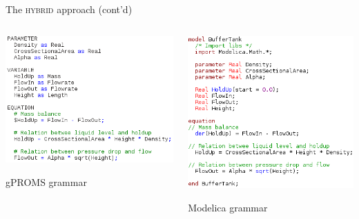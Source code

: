 \documentclass[compress,newPxFont,sthlmFooter]{beamer}
\begin{document}
\begin{frame}[plain]{The \textsc{hybrid} approach (cont'd)}
    \begin{columns}[b]
      \begin{column}{0.5\paperwidth}
        \begin{center}
           \includegraphics[align=c, width=0.35\paperwidth]{gproms_model.png} \par
           {\scriptsize \textcolor{sthlmRed}{gPROMS grammar}}
        \end{center}
      \end{column}
      \begin{column}{0.5\paperwidth}
        \begin{center}
           \includegraphics[align=c, width=0.35\paperwidth]{modelica_model.png} \par
           {\scriptsize \textcolor{sthlmRed}{Modelica grammar}} 
        \end{center}
      \end{column}
    \end{columns}
\end{frame}
\end{document}
